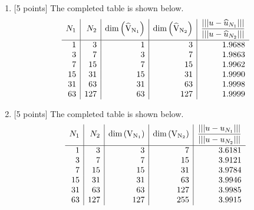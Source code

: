\begin{solution}
\begin{enumerate}
\vspace*{1em}
\item {[5 points]} The completed table is shown below.
\[
\begin{array}{r|r|r|r|r}
N_1 & N_2 & \rm{dim}\left(\widehat{V}_{N_1}\right) & \rm{dim}\left(\widehat{V}_{N_2}\right) & \displaystyle{{\left|\left|\left|u-\widehat{u}_{N_1}\right|\right|\right| \over \left|\left|\left|u-\widehat{u}_{N_2}\right|\right|\right|}}
\\[.75em]
\hline
1 & 3 & 1 & 3 & 1.9688
\\
3 & 7 & 3 & 7 & 1.9863
\\
7 & 15 & 7 & 15 & 1.9962
\\
15 & 31 & 15 & 31 & 1.9990
\\
31 & 63 & 31 & 63 & 1.9998
\\
63 & 127 & 63 & 127 & 1.9999
\end{array}
\]

\vspace*{1em}
\item {[5 points]} The completed table is shown below.
\[
\begin{array}{r|r|r|r|r}
N_1 & N_2 & \rm{dim}\left(V_{N_1}\right) & \rm{dim}\left(V_{N_2}\right) & \displaystyle{{\left|\left|\left|u-u_{N_1}\right|\right|\right| \over \left|\left|\left|u-u_{N_2}\right|\right|\right|}}
\\[.75em]
\hline
1 & 3 & 3 & 7 & 3.6181
\\
3 & 7 & 7 & 15 & 3.9121
\\
7 & 15 & 15 & 31 & 3.9784
\\
15 & 31 & 31 & 63 & 3.9946
\\
31 & 63 & 63 & 127 & 3.9985
\\
63 & 127 & 127 & 255 & 3.9915
\end{array}
\]
\end{enumerate}
\end{solution}

